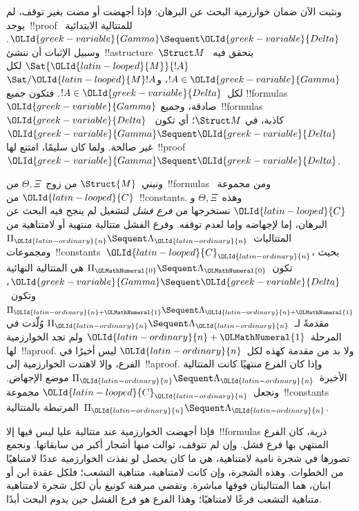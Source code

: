 \documentclass[../../../include/open-logic-section]{subfiles}
\begin{document}


ونثبت الآن ضمان خوارزمية البحث عن البرهان: فإذا أجهضت أو مضت بغير توقف،
لم يوجد~!!{proof} للمتتالية الابتدائية~$\OLId{greek-variable}{Gamma} \Sequent \OLId{greek-variable}{Delta}$. وسبيل
الإثبات أن ننشئ~!!a{structure}~$\Struct M$ يتحقق فيه~$\Sat{\OLId{latin-looped}{M}}{!A}$ لكل
$!A \in \OLId{greek-variable}{Gamma}$، و$\Sat/{\OLId{latin-looped}{M}}{!A}$ لكل~$!A \in \OLId{greek-variable}{Delta}$. فتكون جميع
!!{formula}s~$\OLId{greek-variable}{Gamma}$ صادقة، وجميع~!!{formula}s~$\OLId{greek-variable}{Delta}$ كاذبة، في
$\Struct M$؛ أي تكون~$\OLId{greek-variable}{Gamma} \Sequent \OLId{greek-variable}{Delta}$ غير صالحة. ولما كان
 سليمًا، امتنع لها~!!{proof}~$\OLId{greek-variable}{Gamma} \Sequent \OLId{greek-variable}{Delta}$.

ونبني~$\Struct{M}$ من زوج~$\Theta,\Xi$ من~!!{formula}s ومن مجموعة~$\OLId{latin-looped}{C}$
من~!!{constant}s. وهذه~$\Theta,\Xi$ و$\OLId{latin-looped}{C}$ نستخرجها من \emph{فرع فشل}
لتشغيل لم ينجح فيه البحث عن البرهان، إما لإجهاضه وإما لعدم توقفه. وفرع
الفشل متتالية
منتهية أو لامتناهية من المتتاليات~$\Pi_\OLId{latin-ordinary}{n} \Sequent \Lambda_\OLId{latin-ordinary}{n}$
ومجموعات~!!{constant}s~$\OLId{latin-looped}{C}_\OLId{latin-ordinary}{n}$، بحيث
تكون~$\Pi_\OLMathNumeral{0} \Sequent \Lambda_\OLMathNumeral{0}$ هي المتتالية النهائية
$\OLId{greek-variable}{Gamma} \Sequent \OLId{greek-variable}{Delta}$، وتكون~$\Pi_{\OLId{latin-ordinary}{n}+\OLMathNumeral{1}} \Sequent \Lambda_{\OLId{latin-ordinary}{n}+\OLMathNumeral{1}}$ مقدمةً
لـ~$\Pi_\OLId{latin-ordinary}{n} \Sequent \Lambda_\OLId{latin-ordinary}{n}$ وُلّدت في المرحلة~$\OLId{latin-ordinary}{n}+\OLMathNumeral{1}$ ولم تجد الخوارزمية
لها~!!a{proof}. ولا بد من مقدمة كهذه لكل~$\OLId{latin-ordinary}{n}$ ليس أخيرًا في الفرع، وإلا
لاهتدت الخوارزمية إلى~!!a{proof}. وإذا كان الفرع منتهيًا كانت
المتتالية الأخيرة~$\Pi_\OLId{latin-ordinary}{n} \Sequent \Lambda_\OLId{latin-ordinary}{n}$ موضع الإجهاض. ونجعل~$\OLId{latin-looped}{C}_\OLId{latin-ordinary}{n}$
مجموعة~!!{constant}s المرتبطة بالمتتالية~$\Pi_\OLId{latin-ordinary}{n} \Sequent \Lambda_\OLId{latin-ordinary}{n}$.

فإذا أجهضت الخوارزمية عند متتالية عليا ليس فيها إلا~!!{formula}s ذرية،
كان الفرع المنتهي بها فرع فشل. وإن لم تتوقف، توالت منها أشجار أكبر من
سابقاتها. ونجمع تصورها في شجرة نامية لامتناهية، هي ما كان يحصل لو نفذت
الخوارزمية عددًا لامتناهيًا من الخطوات. وهذه الشجرة، وإن كانت لامتناهية،
متناهية التشعب؛ فلكل عقدة ابن أو ابنان، هما المتتاليتان فوقها مباشرة.
وتقضي مبرهنة كونيغ بأن لكل شجرة لامتناهية متناهية التشعب فرعًا لامتناهيًا؛
وهذا الفرع هو فرع الفشل حين يدوم البحث أبدًا.
\end{document}

